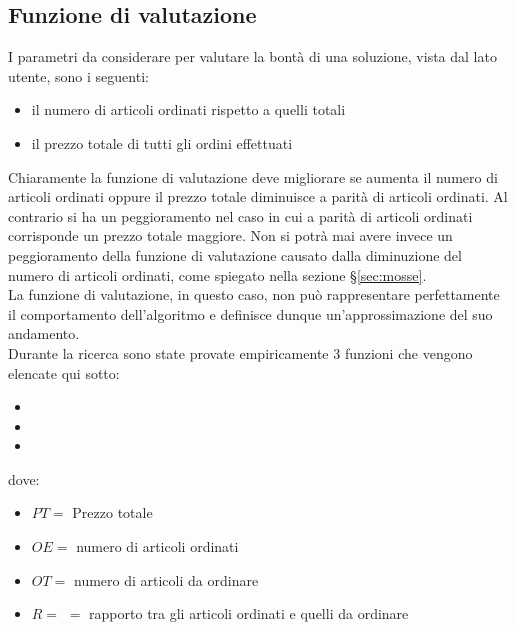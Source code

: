 \subsection{Funzione di valutazione}
\label{sec:funzione-valutazione}
\noindent I parametri da considerare per valutare la bontà di una soluzione, vista dal lato utente,
sono i seguenti:
\begin{itemize}
    \item il numero di articoli ordinati rispetto a quelli totali
    \item il prezzo totale di tutti gli ordini effettuati
\end{itemize}
Chiaramente la funzione di valutazione deve migliorare
se aumenta il numero di articoli ordinati
oppure il prezzo totale diminuisce a parità di articoli ordinati.
Al contrario si ha un peggioramento nel caso in cui a parità di articoli ordinati
corrisponde un prezzo totale maggiore. Non si potrà mai
avere invece un peggioramento della funzione di valutazione causato dalla diminuzione del numero di articoli
ordinati, come spiegato nella sezione §\ref{sec:mosse}.\\
La funzione di valutazione, in questo caso, non può rappresentare perfettamente il
comportamento dell'algoritmo e definisce dunque un'approssimazione del suo andamento.\\
Durante la ricerca sono state provate empiricamente 3 funzioni che vengono elencate qui sotto:
\vspace{1cm}
\begin{center}
    \begin{minipage}{.5\textwidth}
        \begin{itemize}
            \item[] 
            \item[] 
            \item[] 
        \end{itemize}
    \end{minipage}
\end{center}
\vspace*{1cm}
\noindent dove:
\begin{itemize}
    \item $PT = $ Prezzo totale
    \item $OE = $ numero di articoli ordinati
    \item $OT = $ numero di articoli da ordinare
    \item $R =$  $=$ rapporto tra gli articoli ordinati e quelli da ordinare
\end{itemize}

